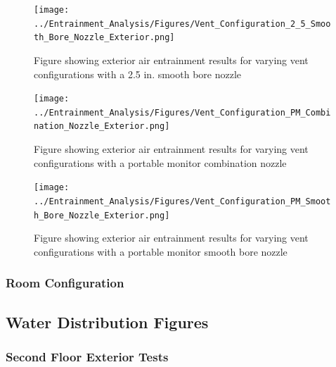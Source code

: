 \documentclass{article}
\begin{document}
\begin{appendices}
\clearpage

\begin{figure}[!ht]
\centering
\texttt{[image: ../Entrainment\_Analysis/Figures/Vent\_Configuration\_2\_5\_Smooth\_Bore\_Nozzle\_Exterior.png]}
\caption{Figure showing exterior air entrainment results for varying vent configurations with a 2.5 in. smooth bore nozzle}
\label{fig:2_5_Exterior_Smooth_Bore_Vent_Config}
\end{figure}

\clearpage

\begin{figure}[!ht]
\centering
\texttt{[image: ../Entrainment\_Analysis/Figures/Vent\_Configuration\_PM\_Combination\_Nozzle\_Exterior.png]}
\caption{Figure showing exterior air entrainment results for varying vent configurations with a portable monitor combination nozzle}
\label{fig:PM_Exterior_Combination_Vent_Config}
\end{figure}

\clearpage

\begin{figure}[!ht]
\centering
\texttt{[image: ../Entrainment\_Analysis/Figures/Vent\_Configuration\_PM\_Smooth\_Bore\_Nozzle\_Exterior.png]}
\caption{Figure showing exterior air entrainment results for varying vent configurations with a portable monitor smooth bore nozzle}
\label{fig:PM_Exterior_Smooth_Bore_Vent_Config}
\end{figure}

\clearpage

\subsubsection{Room Configuration}



\clearpage

\subsection{Water Distribution Figures}
\label{app:Water_Distribution_Figures}

\subsubsection{Second Floor Exterior Tests}


\end{appendices}
\end{document}
